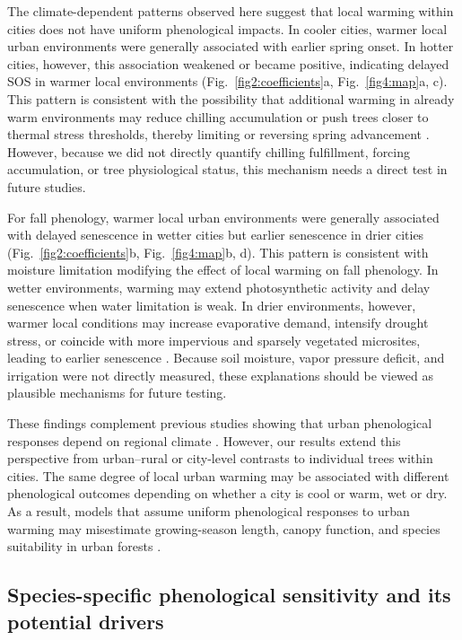 The climate-dependent patterns observed here suggest that local warming within cities does not have uniform phenological impacts. In cooler cities, warmer local urban environments were generally associated with earlier spring onset. In hotter cities, however, this association weakened or became positive, indicating delayed SOS in warmer local environments (Fig.~\ref{fig2:coefficients}a, Fig.~\ref{fig4:map}a, c). This pattern is consistent with the possibility that additional warming in already warm environments may reduce chilling accumulation or push trees closer to thermal stress thresholds, thereby limiting or reversing spring advancement \citep{Liang2024UFUG, Yin2024EarthsFuture}. However, because we did not directly quantify chilling fulfillment, forcing accumulation, or tree physiological status, this mechanism needs a direct test in future studies.

For fall phenology, warmer local urban environments were generally associated with delayed senescence in wetter cities but earlier senescence in drier cities (Fig.~\ref{fig2:coefficients}b, Fig.~\ref{fig4:map}b, d). This pattern is consistent with moisture limitation modifying the effect of local warming on fall phenology. In wetter environments, warming may extend photosynthetic activity and delay senescence when water limitation is weak. In drier environments, however, warmer local conditions may increase evaporative demand, intensify drought stress, or coincide with more impervious and sparsely vegetated microsites, leading to earlier senescence \citep{Franceschi2023UFUG, Liang2024UFUG, Stratopoulos2019IJB, Yin2024EarthsFuture}. Because soil moisture, vapor pressure deficit, and irrigation were not directly measured, these explanations should be viewed as plausible mechanisms for future testing.

These findings complement previous studies showing that urban phenological responses depend on regional climate \citep{Li2019NatEcoEvol, Meng2020PNAS, Yang2023GCB}. However, our results extend this perspective from urban--rural or city-level contrasts to individual trees within cities. The same degree of local urban warming may be associated with different phenological outcomes depending on whether a city is cool or warm, wet or dry. As a result, models that assume uniform phenological responses to urban warming may misestimate growing-season length, canopy function, and species suitability in urban forests \citep{Fu2023GCB, Li2019NatEcoEvol}.

\subsection{Species-specific phenological sensitivity and its potential drivers}

